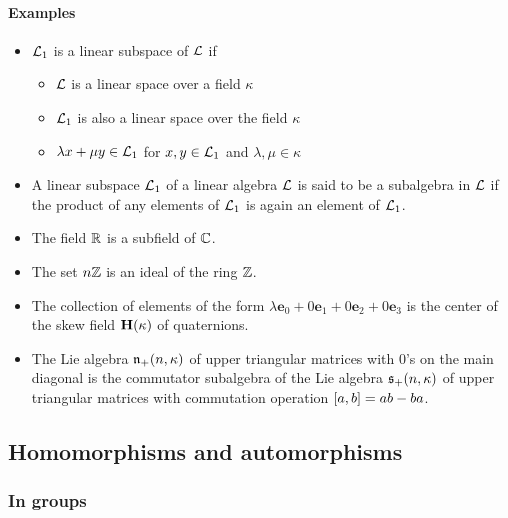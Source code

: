 \paragraph{Examples}
\begin{itemize}
	\item $\mathcal{L}_1$ is a linear subspace of $\mathcal{L}$ if
	\begin{itemize}
		\item $\mathcal{L}$ is a linear space over a field $\kappa$
		\item $\mathcal{L}_1$ is also a linear space over the field $\kappa$
		\item $\lambda x+\mu y\in \mathcal{L}_1$ for $x,y\in \mathcal{L}_1$ and $\lambda,\mu\in\kappa$
	\end{itemize}
	\item A linear subspace $\mathcal{L}_1$ of a linear algebra $\mathcal{L}$ is said to be a subalgebra in $\mathcal{L}$ if the product of any elements of $\mathcal{L}_1$ is again an element of $\mathcal{L}_1$.
	\item The field $\mathbb{R}$ is a subfield of $\mathbb{C}$.
	\item The set $n\mathbb{Z}$ is an ideal of the ring $\mathbb{Z}$.
	\item The collection of elements of the form $\lambda \bm{e}_0+0\bm{e}_1+0\bm{e}_2+0\bm{e}_3$ is the
	center of the skew field $\mathbf{H}(\kappa)$ of quaternions. 
	\item The Lie algebra $\mathfrak{n}_+(n, \kappa)$ of upper triangular matrices with $0$'s on the main diagonal is the commutator subalgebra of the Lie algebra $\mathfrak{s}_+(n, \kappa)$ of upper triangular matrices with commutation operation $\comm{a}{b}=ab-ba$.
\end{itemize}

\subsection{Homomorphisms and automorphisms}
\subsubsection{In groups}
